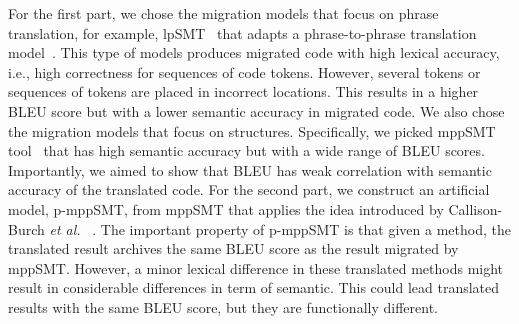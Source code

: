 For the first part, we chose the migration models that focus on phrase
translation, for example, lpSMT~\cite{fse13-nier} that adapts a
phrase-to-phrase translation model~\cite{phrasal10}. This type of
models produces migrated code with high lexical accuracy, i.e., high
correctness for sequences of code tokens. However, several tokens or
sequences of tokens are placed in incorrect locations.  This results
in a higher BLEU score but with a lower semantic accuracy in migrated
code. We also chose the migration models that focus on
structures. Specifically, we picked mppSMT tool~\cite{ase15} that has
high semantic accuracy but with a wide range of BLEU
scores. Importantly, we aimed to show that BLEU has weak correlation
with semantic accuracy of the translated code. 
%
%
For the second part, we construct an artificial model, p-mppSMT, from mppSMT
\cite{ase15} that applies the idea introduced by Callison-Burch {\em et al.}
~\cite{Callison}. The important property of p-mppSMT is that given a method,
 the translated result archives the same BLEU score as the result migrated 
by mppSMT. However, a minor lexical difference in these translated methods 
might result in considerable differences in term of semantic. This could lead 
translated results with the same BLEU score, but they are functionally different. 


